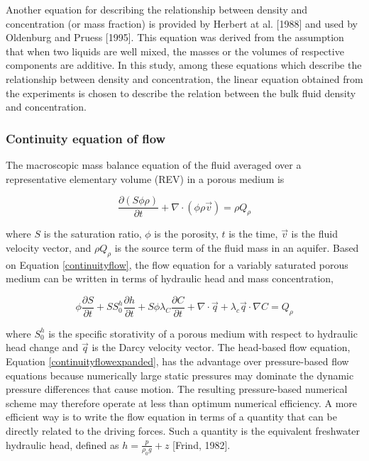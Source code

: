 Another equation for describing the relationship between density and
concentration (or mass fraction) is provided by Herbert at al.
[1988] and used by Oldenburg and Pruess [1995]. This equation was
derived from the assumption that when two liquids are well mixed,
the masses or the volumes of respective components are additive. In
this study, among these equations which describe the relationship
between density and concentration, the linear equation obtained from
the experiments is chosen to describe the relation between the bulk
fluid density and concentration.

\subsubsection{Continuity equation of flow}\label{SS:ContinuityFlowEquation}

The macroscopic mass balance equation of the fluid averaged over a
representative elementary volume (REV) in a porous medium is

\begin{equation}\label{continuityflow}
\frac{{\partial \left( {S\phi \rho } \right)}}{{\partial t}} +
\nabla  \cdot \left( {\phi \rho \vec v} \right) = \rho Q_\rho
\end{equation}

where $S$ is the saturation ratio, $\phi$ is the porosity, $t$ is
the time, $\vec v$ is the fluid velocity vector, and $\rho Q_\rho$
is the source term of the fluid mass in an aquifer. Based on
Equation \ref{continuityflow}, the flow equation for a variably
saturated porous medium can be written in terms of hydraulic head
and mass concentration,

\begin{equation}\label{continuityflowexpanded}
\phi \frac{{\partial S}}{{\partial t}} + SS_0^h \frac{{\partial
h}}{{\partial t}} + S\phi \lambda _C \frac{{\partial C}}{{\partial
t}} + \nabla  \cdot \vec q + \lambda _c \vec q \cdot \nabla C =
Q_\rho
\end{equation}

where $S_0^h$ is the specific storativity of a porous medium with
respect to hydraulic head change and $\vec q$ is the Darcy velocity
vector. The head-based flow equation, Equation
\ref{continuityflowexpanded}, has the advantage over pressure-based
flow equations because numerically large static pressures may
dominate the dynamic pressure differences that cause motion. The
resulting pressure-based numerical scheme may therefore operate at
less than optimum numerical efficiency. A more efficient way is to
write the flow equation in terms of a quantity that can be directly
related to the driving forces. Such a quantity is the equivalent
freshwater hydraulic head, defined as $h = \frac{p}{{\rho _0 g}} +
z$ [Frind, 1982].


